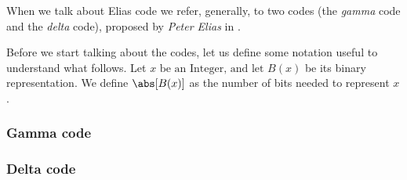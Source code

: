 \documentclass{subfiles}
\begin{document}
    When we talk about Elias code we refer, generally, 
        to two codes (the \emph{gamma} code and the \emph{delta} code),
        proposed by \emph{Peter Elias} in \cite{elias1975}.

    Before we start talking about the codes,
        let us define some notation useful to understand what follows.
        Let \(x \text{ be an Integer, and let } B(x)\) be its binary representation.
        We define \(\abs[B(x)]\) as the number of bits needed to represent \(x\).

    \subsubsection{Gamma code}
    

    \subsubsection{Delta code}
    
\end{document}
